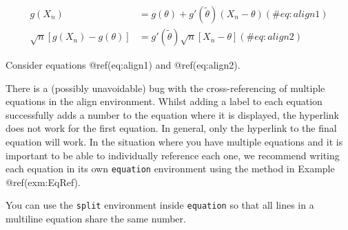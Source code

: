 \documentclass[
  letterpaper,
  oneside]{book}
\numberwithin{equation}{section}
\numberwithin{figure}{section}
\theoremstyle{break}
\theoremstyle{plain}
\theoremstyle{remark}
\begin{document}
\begin{align}
g(X_{n}) &= g(\theta)+g'({\tilde{\theta}})(X_{n}-\theta) (\#eq:align1) \\
\sqrt{n}[g(X_{n})-g(\theta)] &= g'\left({\tilde{\theta}}\right)
  \sqrt{n}[X_{n}-\theta ] 
(\#eq:align2)
\end{align}

Consider equations @ref(eq:align1) and @ref(eq:align2).

There is a (possibly unavoidable) bug with the cross-referencing of
multiple equations in the align environment. Whilst adding a label to
each equation successfully adds a number to the equation where it is
displayed, the hyperlink does not work for the first equation. In
general, only the hyperlink to the final equation will work. In the
situation where you have multiple equations and it is important to be
able to individually reference each one, we recommend writing each
equation in its own \texttt{equation} environment using the method in
Example @ref(exm:EqRef).

You can use the \texttt{split} environment inside \texttt{equation} so
that all lines in a multiline equation share the same number.
\end{document}
